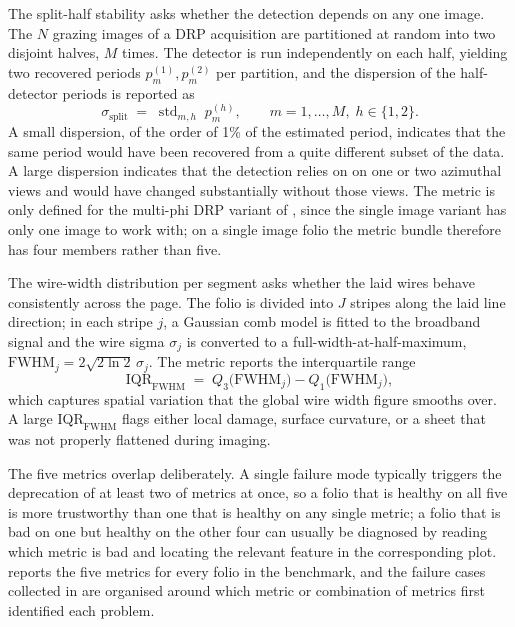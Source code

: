 The split-half stability asks whether the detection depends on any
one image. The $N$ grazing images of a DRP acquisition are
partitioned at random into two disjoint halves, $M$ times. The
detector is run independently on each half, yielding two recovered
periods $p_m^{(1)}, p_m^{(2)}$ per partition, and the dispersion of
the half-detector periods is reported as
\begin{equation}
  \sigma_{\mathrm{split}} \;=\;
  \mathop{\mathrm{std}}_{m, h}\; p_m^{(h)},
  \qquad m = 1, \dots, M,\; h \in \{1, 2\}.
  \label{eq:split_half}
\end{equation}
A small dispersion, of the order of 1\% of the estimated
period, indicates that the same period would have been recovered
from a quite different subset of the data. A large dispersion
indicates that the detection relies on on one or two azimuthal views
and would have changed substantially without those views.
The metric is only defined for the multi-phi DRP variant of
, since the single image variant has only
one image to work with; on a single image folio the metric bundle
therefore has four members rather than five.

The wire-width distribution per segment asks whether the laid wires
behave consistently across the page. The folio is divided into $J$
stripes along the laid line direction; in each stripe $j$, a
Gaussian comb model is fitted to the broadband signal and the wire
sigma $\sigma_j$ is converted to a full-width-at-half-maximum,
$\mathrm{FWHM}_j = 2\sqrt{2\ln 2}\,\sigma_j$. The metric reports the
interquartile range
\begin{equation}
  \mathrm{IQR}_{\mathrm{FWHM}} \;=\;
  Q_3\bigl(\mathrm{FWHM}_j\bigr) - Q_1\bigl(\mathrm{FWHM}_j\bigr),
  \label{eq:wire_iqr}
\end{equation}
which captures spatial variation that the global wire width figure
smooths over. A large $\mathrm{IQR}_{\mathrm{FWHM}}$ flags either
local damage, surface curvature, or a sheet that was not properly
flattened during imaging.

The five metrics overlap deliberately. A single failure mode
typically triggers the deprecation of at least two of metrics at once, so a folio that is
healthy on all five is more trustworthy than one that is healthy on
any single metric; a folio that is bad on one but healthy on the
other four can usually be diagnosed by reading which metric is bad
and locating the relevant feature in the corresponding plot.
 reports the five metrics for every folio in the
benchmark, and the failure cases collected in
 are organised around which metric or
combination of metrics first identified each problem.
